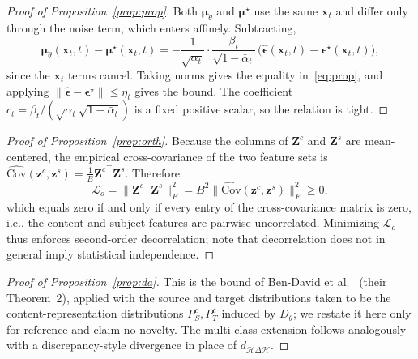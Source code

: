 \begin{proof}[Proof of Proposition~\ref{prop:prop}]
Both $\boldsymbol{\mu}_\theta$ and $\boldsymbol{\mu}^\star$ use the same
$\mathbf{x}_t$ and differ only through the noise term, which enters affinely.
Subtracting,
\[
\boldsymbol{\mu}_\theta(\mathbf{x}_t,t)-\boldsymbol{\mu}^\star(\mathbf{x}_t,t)
=-\frac{1}{\sqrt{\alpha_t}}\cdot\frac{\beta_t}{\sqrt{1-\bar{\alpha}_t}}\,
\big(\widehat{\boldsymbol{\epsilon}}(\mathbf{x}_t,t)-\boldsymbol{\epsilon}^\star(\mathbf{x}_t,t)\big),
\]
since the $\mathbf{x}_t$ terms cancel. Taking norms gives the equality
in~\eqref{eq:prop}, and applying
$\|\widehat{\boldsymbol{\epsilon}}-\boldsymbol{\epsilon}^\star\|\le\eta_t$ gives
the bound. The coefficient $c_t=\beta_t/(\sqrt{\alpha_t}\sqrt{1-\bar{\alpha}_t})$
is a fixed positive scalar, so the relation is tight.
\end{proof}

\begin{proof}[Proof of Proposition~\ref{prop:orth}]
Because the columns of $\mathbf{Z}^{c}$ and $\mathbf{Z}^{s}$ are mean-centered,
the empirical cross-covariance of the two feature sets is
$\widehat{\mathrm{Cov}}(\mathbf{z}^{c},\mathbf{z}^{s})=\tfrac{1}{B}{\mathbf{Z}^{c}}^{\!\top}\mathbf{Z}^{s}$.
Therefore
\[
\mathcal{L}_o=\big\|{\mathbf{Z}^{c}}^{\!\top}\mathbf{Z}^{s}\big\|_F^2
=B^2\big\|\widehat{\mathrm{Cov}}(\mathbf{z}^{c},\mathbf{z}^{s})\big\|_F^2\ge 0,
\]
which equals zero if and only if every entry of the cross-covariance matrix is
zero, i.e., the content and subject features are pairwise uncorrelated.
Minimizing $\mathcal{L}_o$ thus enforces second-order decorrelation; note that
decorrelation does not in general imply statistical independence.
\end{proof}

\begin{proof}[Proof of Proposition~\ref{prop:da}]
This is the bound of Ben-David et al.~\cite{bendavid2010theory} (their
Theorem~2), applied with the source and target distributions taken to be the
content-representation distributions $P^{c}_S,P^{c}_T$ induced by $D_\theta$; we
restate it here only for reference and claim no novelty. The multi-class
extension follows analogously with a discrepancy-style divergence in place of
$d_{\mathcal{H}\Delta\mathcal{H}}$.
\end{proof}

